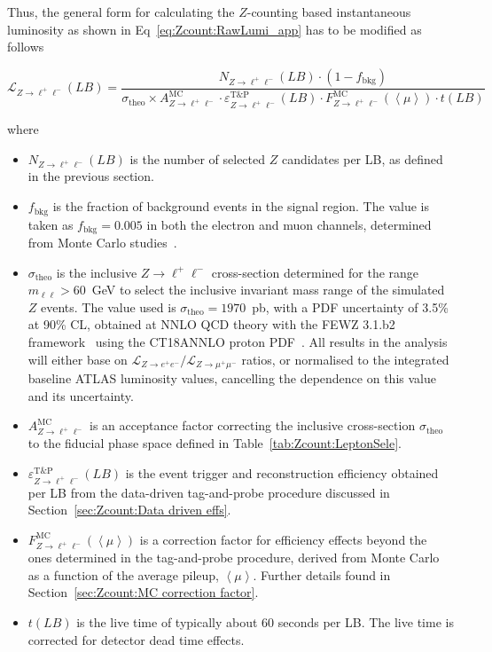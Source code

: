 Thus, the general form for calculating the $Z$-counting based instantaneous luminosity as shown in Eq~\ref{eq:Zcount:RawLumi_app} has to be modified as follows

\begin{equation}
\mathcal{L}_{Z\rightarrow \ell^+\ell^-} (LB) = \frac{N_{Z\rightarrow \ell^+\ell^-}(LB)\cdot (1-f_\text{bkg})}{\sigma_\text{theo}\times A^\text{MC}_{Z\rightarrow \ell^+\ell^-}\cdot \varepsilon^\text{T\&P}_{Z\rightarrow \ell^+\ell^-}(LB) \cdot F^\text{MC}_{Z\rightarrow \ell^+\ell^-}(\left< \mu \right>)\cdot t(LB)}
\label{eq:Zcount:ZLumi_app}
\end{equation}

where

\begin{itemize}
	\item $N_{Z\rightarrow \ell^+\ell^-}(LB)$ is the number of selected $Z$ candidates per LB, as defined in the previous section.
	\item $f_\text{bkg}$ is the fraction of background events in the signal region. The value is taken as $f_\text{bkg}=0.005$ in both the electron and muon channels, determined from Monte Carlo studies~\cite{ATLAS:2019zci}.
	\item $\sigma_\text{theo}$ is the inclusive $Z\rightarrow \ell^+\ell^-$ cross-section determined for the range $m_{\ell\ell}>60$~GeV to select the inclusive invariant mass range of the simulated $Z$ events. The value used is $\sigma_\text{theo}=1970$~pb, with a PDF uncertainty of 3.5\% at 90\% CL, obtained at NNLO QCD theory with the FEWZ 3.1.b2 framework~\cite{PhysRevD.86.094034} using the CT18ANNLO proton PDF~\cite{Hou:2019efy}. All results in the analysis will either base on $\mathcal{L}_{Z\rightarrow e^+e^-}/\mathcal{L}_{Z\rightarrow \mu^+\mu^-}$ ratios, or normalised to the integrated baseline ATLAS luminosity values, cancelling the dependence on this value and its uncertainty.
	\item $A^\text{MC}_{Z\rightarrow \ell^+\ell^-}$ is an acceptance factor correcting the inclusive cross-section $\sigma_\text{theo}$ to the fiducial phase space defined in Table~\ref{tab:Zcount:LeptonSele}.
	\item $\varepsilon^\text{T\&P}_{Z\rightarrow \ell^+\ell^-}(LB)$ is the event trigger and reconstruction efficiency obtained per LB from the data-driven tag-and-probe procedure discussed in Section~\ref{sec:Zcount:Data driven effs}.
	\item $F^\text{MC}_{Z\rightarrow \ell^+\ell^-}(\left< \mu \right>)$ is a correction factor for efficiency effects beyond the ones determined in the tag-and-probe procedure, derived from Monte Carlo as a function of the average pileup, $\left< \mu \right>$. Further details found in Section~\ref{sec:Zcount:MC correction factor}.
	\item $t(LB)$ is the live time of typically about 60 seconds per LB. The live time is corrected for detector dead time effects.
\end{itemize}

